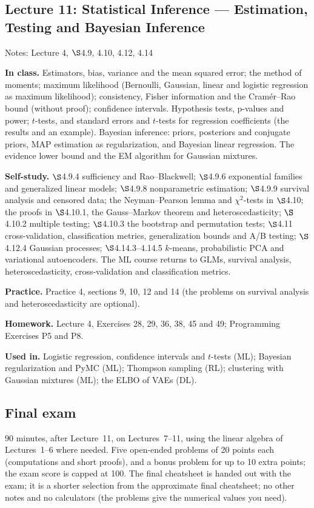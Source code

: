 \documentclass[11pt]{article}
\newcommand{\lecture}[3]{\subsection*{Lecture #1: #2}\textcolor{black!60}{Notes: #3}\par}
\newcommand{\block}[1]{\par\smallskip\textbf{#1}\quad}
\begin{document}
\lecture{11}{Statistical Inference --- Estimation, Testing and Bayesian Inference}{Lecture 4, $\S$4.9, 4.10, 4.12, 4.14}
\block{In class.} Estimators, bias, variance and the mean squared error; the method of moments; maximum likelihood (Bernoulli, Gaussian, linear and logistic regression as maximum likelihood); consistency, Fisher information and the Cram\'er--Rao bound (without proof); confidence intervals. Hypothesis tests, p-values and power; $t$-tests, and standard errors and $t$-tests for regression coefficients (the results and an example). Bayesian inference: priors, posteriors and conjugate priors, MAP estimation as regularization, and Bayesian linear regression. The evidence lower bound and the EM algorithm for Gaussian mixtures.
\block{Self-study.} $\S$4.9.4 sufficiency and Rao--Blackwell; $\S$4.9.6 exponential families and generalized linear models; $\S$4.9.8 nonparametric estimation; $\S$4.9.9 survival analysis and censored data; the Neyman--Pearson lemma and $\chi^2$-tests in $\S$4.10; the proofs in $\S$4.10.1, the Gauss--Markov theorem and heteroscedasticity; $\S$4.10.2 multiple testing; $\S$4.10.3 the bootstrap and permutation tests; $\S$4.11 cross-validation, classification metrics, generalization bounds and A/B testing; $\S$4.12.4 Gaussian processes; $\S$4.14.3--4.14.5 $k$-means, probabilistic PCA and variational autoencoders. The ML course returns to GLMs, survival analysis, heteroscedasticity, cross-validation and classification metrics.
\block{Practice.} Practice 4, sections 9, 10, 12 and 14 (the problems on survival analysis and heteroscedasticity are optional).
\block{Homework.} Lecture 4, Exercises 28, 29, 36, 38, 45 and 49; Programming Exercises P5 and P8.
\block{Used in.} Logistic regression, confidence intervals and $t$-tests (ML); Bayesian regularization and PyMC (ML); Thompson sampling (RL); clustering with Gaussian mixtures (ML); the ELBO of VAEs (DL).

\subsection*{Final exam}
$90$ minutes, after Lecture~11, on Lectures~7--11, using the linear algebra of Lectures~1--6 where needed. Five open-ended problems of 20 points each (computations and short proofs), and a bonus problem for up to 10 extra points; the exam score is capped at 100. The final cheatsheet is handed out with the exam; it is a shorter selection from the approximate final cheatsheet; no other notes and no calculators (the problems give the numerical values you need).
\end{document}
